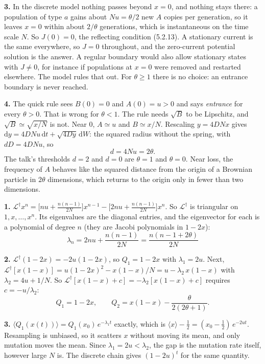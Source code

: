 \documentclass[11pt]{article}
\newcommand{\dd}{\mathrm{d}}
\newcommand{\avg}[1]{\langle #1\rangle}
\newcommand{\exsec}[1]{\par\vspace{6pt}{\sffamily\bfseries\large\color{PineGreen}#1}\par\vspace{-2pt}}
\begin{document}
\textbf{3.} In the discrete model nothing passes beyond $x=0$, and nothing stays there: a population of type $a$
gains about $Nu=\theta/2$ new $A$ copies per generation, so it leaves $x=0$ within about $2/\theta$ generations,
which is instantaneous on the time scale $N$. So $J(0)=0$, the reflecting condition (5.2.13). A stationary current is the
same everywhere, so $J=0$ throughout, and the zero-current potential solution is the answer. A regular boundary
would also allow stationary states with $J\ne0$, for instance if populations at $x=0$ were removed and restarted
elsewhere. The model rules that out. For $\theta\ge1$ there is no choice: an entrance boundary is never reached.

\textbf{4.} The quick rule sees $B(0)=0$ and $A(0)=u>0$ and says \emph{entrance} for every $\theta>0$. That is wrong
for $\theta<1$. The rule needs $\sqrt B$ to be Lipschitz, and $\sqrt B\simeq\sqrt{x/N}$ is not. Near $0$,
$A\simeq u$ and $B\simeq x/N$. Rescaling $y=4DNx$ gives $\dd y=4DNu\,\dd t+\sqrt{4Dy}\,\dd W$: the squared radius
without the spring, with $dD=4DNu$, so
\[ d=4Nu=2\theta. \]
The talk's thresholds $d=2$ and $d=0$ are $\theta=1$ and $\theta=0$. Near loss, the frequency of $A$ behaves like
the squared distance from the origin of a Brownian particle in $2\theta$ dimensions, which returns to the origin
only in fewer than two dimensions.

\exsec{(c) Find the eigenfunctions}
\textbf{1.} $\mathcal L^\dagger x^n=\bigl[nu+\tfrac{n(n-1)}{2N}\bigr]x^{n-1}-\bigl[2nu+\tfrac{n(n-1)}{2N}\bigr]x^n$.
So $\mathcal L^\dagger$ is triangular on $1,x,\dots,x^n$. Its eigenvalues are the diagonal entries, and the
eigenvector for each is a polynomial of degree $n$ (they are Jacobi polynomials in $1-2x$):
\[ \boxed{\;\lambda_n=2nu+\frac{n(n-1)}{2N}=\frac{n(n-1+2\theta)}{2N}\;} \]

\textbf{2.} $\mathcal L^\dagger(1-2x)=-2u(1-2x)$, so $Q_1=1-2x$ with $\lambda_1=2u$. Next,
$\mathcal L^\dagger[x(1-x)]=u(1-2x)^2-x(1-x)/N=u-\lambda_2\,x(1-x)$ with $\lambda_2=4u+1/N$. So
$\mathcal L^\dagger[x(1-x)+c]=-\lambda_2[x(1-x)+c]$ requires $c=-u/\lambda_2$:
\[ Q_1=1-2x,\qquad Q_2=x(1-x)-\frac\theta{2(2\theta+1)}. \]

\textbf{3.} $\avg{Q_1(x(t))}=Q_1(x_0)\,e^{-\lambda_1t}$ exactly, which is $\avg x-\frac12=(x_0-\frac12)\,e^{-2ut}$.
Resampling is unbiased, so it scatters $x$ without moving its mean, and only mutation moves the mean. Since
$\lambda_1=2u<\lambda_2$, the gap is the mutation rate itself, however large $N$ is. The discrete chain gives
$(1-2u)^t$ for the same quantity.
\end{document}
